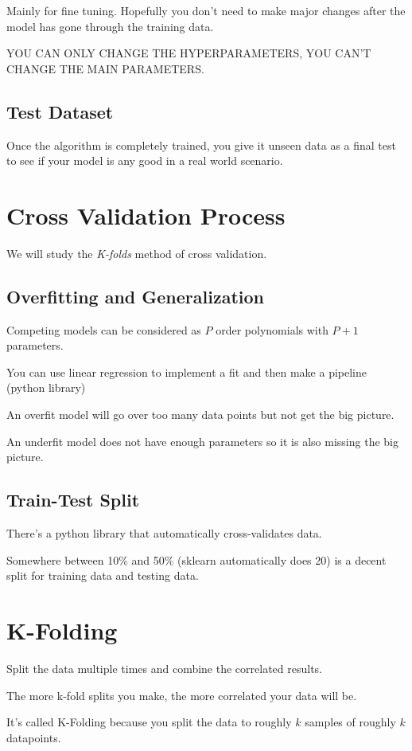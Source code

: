 \documentclass[fleqn]{report}
\begin{document}
Mainly for fine tuning. Hopefully you don't need to make major changes 
after the model has gone through the training data. 

YOU CAN ONLY CHANGE THE HYPERPARAMETERS, YOU CAN'T CHANGE THE MAIN PARAMETERS.

\subsection{Test Dataset}
Once the algorithm is completely trained, you give it unseen data as a final 
test to see if your model is any good in a real world scenario. 

\section{Cross Validation Process}
We will study the \textit{K-folds} method of cross validation. 

\subsection{Overfitting and Generalization}
Competing models can be considered as $P$ order polynomials with $P+1$ parameters.

You can use linear regression to implement a fit and 
then make a pipeline (python library)

An overfit model will go over too many data points but not get the big picture. 

An underfit model does not have enough parameters so it is also missing the 
big picture. 

\subsection{Train-Test Split}
There's a python library that automatically cross-validates data. 

Somewhere between 10\% and 50\% (sklearn automatically does 20)
is a decent split for training data and testing data. 

\section{K-Folding}
Split the data multiple times and combine the correlated results. 

The more k-fold splits you make, the more correlated your data will be. 

It's called K-Folding because you split the data to roughly $k$ samples 
of roughly $k$ datapoints. 
\end{document}
